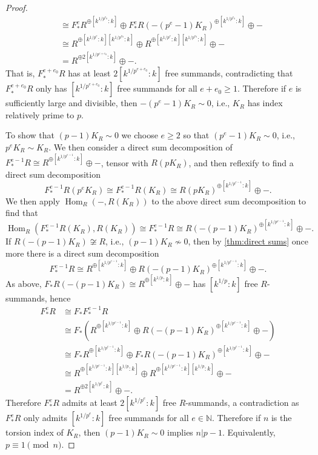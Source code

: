 \documentclass[reqno,11pt]{amsart}
\numberwithin{equation}{section}
\theoremstyle{definition}
\theoremstyle{definition}
\theoremstyle{definition}
\theoremstyle{remark}
\newcommand{\Hom}{\operatorname{Hom}}
\newcommand{\NN}{\mathbb{N}}
\begin{document}
\begin{proof}
\begin{align*}
        & \cong F^e_*R^{\oplus [k^{1/p^{e_0}}:k]} \oplus F^e_*R(-(p^e-1)K_R)^{\oplus [k^{1/p^{e_0}}:k]}\oplus -\\
        & \cong R^{\oplus [k^{1/p^{e}}:k][k^{1/p^{e_0}}:k]}\oplus R^{\oplus [k^{1/p^{e}}:k][k^{1/p^{e_0}}:k]}\oplus -\\
        & = R^{\oplus 2[k^{1/p^{e+e_0}}:k]}\oplus -.
    \end{align*}
    That is, $F^{e+e_0}_*R$ has at least $2[k^{1/p^{e+e_0}}:k]$ free summands, contradicting that $F^{e+e_0}_*R$ only has $[k^{1/p^{e+e_0}}:k]$ free summands for all $e+e_0\geq 1$. Therefore if $e$ is sufficiently large and divisible, then $-(p^e-1)K_R\sim 0$, i.e., $K_R$ has index relatively prime to $p$.


    To show that $(p-1)K_R\sim 0$ we choose $e\geq 2$ so that $(p^e-1)K_R\sim 0$, i.e., $p^eK_R\sim K_R$. We then consider a direct sum decomposition of $F^{e-1}_*R\cong R^{\oplus [k^{1/p^{e-1}}:k]}\oplus -$, tensor with $R(pK_R)$, and then reflexify to find a direct sum decomposition
    \[
    F^{e-1}_*R(p^eK_R)\cong F^{e-1}_*R(K_R)\cong R(pK_R)^{\oplus [k^{1/p^{e-1}}:k]}\oplus -.
    \]
    We then apply $\Hom_R(-,R(K_R))$ to the above direct sum decomposition to find that
    \[
    \Hom_R(F^{e-1}_*R(K_R),R(K_R))\cong F^{e-1}_*R\cong R(-(p-1)K_R)^{\oplus [k^{1/p^{e-1}}:k]}\oplus -.
    \]
    If $R(-(p-1)K_R)\not\cong R$, i.e., $(p-1)K_R\not\sim 0$, then by \cref{thm:direct sums} once more there is a direct sum decomposition
    \[
    F^{e-1}_*R\cong R^{\oplus [k^{1/p^{e-1}}:k]}\oplus R(-(p-1)K_R)^{\oplus [k^{1/p^{e-1}}:k]}\oplus -.
    \]
    As above, $F_*R(-(p-1)K_R)\cong R^{\oplus [k^{1/p}:k]}\oplus -$ has $[k^{1/p}:k]$ free $R$-summands, hence
    \begin{align*}
        F^e_*R & \cong F_*F^{e-1}_*R \\
        & \cong F_*\left(R^{\oplus [k^{1/p^{e-1}}:k]}\oplus R(-(p-1)K_R)^{\oplus [k^{1/p^{e-1}}:k]}\oplus -\right)\\
        & \cong F_*R^{\oplus [k^{1/p^{e-1}}:k]}\oplus F_*R(-(p-1)K_R)^{\oplus [k^{1/p^{e-1}}:k]}\oplus -\\
        & \cong R^{\oplus [k^{1/p^{e-1}}:k][k^{1/p}:k]}\oplus R^{\oplus [k^{1/p^{e-1}}:k][k^{1/p}:k]}\oplus -\\
        & = R^{\oplus 2[k^{1/p^{e}}:k]} \oplus -.
    \end{align*}
    Therefore $F^e_*R$ admits at least $2 [k^{1/p^{e}}:k]$ free $R$-summands, a contradiction as $F^e_*R$ only admits $[k^{1/p^{e}}:k]$ free summands for all $e\in\NN$. Therefore if $n$ is the torsion index of $K_R$, then $(p-1)K_R\sim 0$ implies $n|p-1$. Equivalently, $p\equiv 1\pmod{n}$.
\end{proof}
\end{document}
